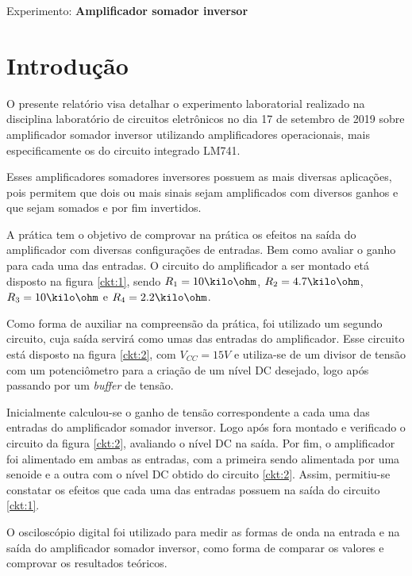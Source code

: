 \begin{center}
\large Experimento: \textbf{Amplificador somador inversor}
\end{center}


\section{Introdução}

O presente relatório visa detalhar o experimento laboratorial realizado na disciplina laboratório de circuitos eletrônicos no dia 17 de setembro de 2019 sobre amplificador somador inversor utilizando amplificadores operacionais, mais especificamente os do circuito integrado LM741.

Esses amplificadores somadores inversores possuem as mais diversas aplicações, pois permitem que dois ou mais sinais sejam amplificados com diversos ganhos e que sejam somados e por fim invertidos. 

A prática tem o objetivo de comprovar na prática os efeitos na saída do amplificador com diversas configurações de entradas. Bem como avaliar o ganho para cada uma das entradas. O circuito do amplificador a ser montado etá disposto na figura \ref{ckt:1}, sendo $R_1 = 10 \kilo \ohm$, $R_2 = 4.7 \kilo \ohm$, $R_3 = 10 \kilo \ohm$ e $R_4 = 2.2 \kilo \ohm$.




Como forma de auxiliar na compreensão da prática, foi utilizado um segundo circuito, cuja saída servirá como umas das entradas do amplificador. Esse circuito está disposto na figura \ref{ckt:2}, com $V_{CC} = 15V$ e utiliza-se de um divisor de tensão com um potenciômetro para a criação de um nível DC desejado, logo após passando por um \textit{buffer} de tensão.



Inicialmente calculou-se o ganho de tensão correspondente a cada uma das entradas do amplificador somador inversor. Logo após fora montado e verificado o circuito da figura \ref{ckt:2}, avaliando o nível DC na saída. Por fim, o amplificador foi alimentado em ambas as entradas, com a primeira sendo alimentada por uma senoide e a outra com o nível DC obtido do circuito \ref{ckt:2}. Assim, permitiu-se constatar os efeitos que cada uma das entradas possuem na saída do circuito \ref{ckt:1}.

O osciloscópio digital foi utilizado para medir as formas de onda na entrada e na saída do amplificador somador inversor, como forma de comparar os valores e comprovar os resultados teóricos.

